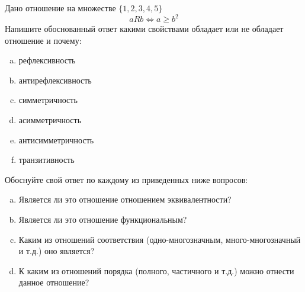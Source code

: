 \question
Дано отношение на множестве $\{1, 2, 3, 4, 5\}$ 
\begin{equation*}
aRb \iff a \geq b^2
\end{equation*}
Напишите обоснованный ответ какими свойствами обладает или не обладает отношение и почему:   
\begin{enumerate} [a)]\setcounter{enumi}{0}
\item рефлексивность
\item антирефлексивность
\item симметричность
\item асимметричность
\item антисимметричность
\item транзитивность
\end{enumerate}

Обоснуйте свой ответ по каждому из приведенных ниже вопросов:
\begin{enumerate} [a)]\setcounter{enumi}{0}
    \item Является ли это отношение отношением эквивалентности?
    \item Является ли это отношение функциональным?
    \item Каким из отношений соответствия (одно-многозначным, много-многозначный и т.д.) оно является?
    \item К каким из отношений порядка (полного, частичного и т.д.) можно отнести данное отношение?
\end{enumerate}


